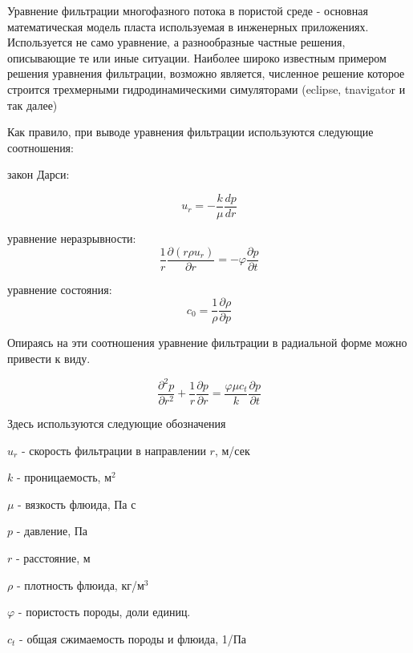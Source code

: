 Уравнение фильтрации многофазного потока в пористой среде - основная математическая модель пласта используемая в инженерных приложениях. Используется не само уравнение, а разнообразные частные решения, описывающие те или иные ситуации. Наиболее широко известным примером решения уравнения фильтрации, возможно является, численное решение которое строится трехмерными гидродинамическими симуляторами (eclipse, tnavigator и так далее)


Как правило, при выводе уравнения фильтрации используются следующие соотношения:

закон Дарси:  

\begin{equation} \label{eq:darcy_law_1}
 u_r=-\frac{k}{\mu}\frac{dp}{dr} 
\end{equation}

уравнение неразрывности: 
\begin{equation} \label{eq:mass_balance_1} 
\frac{1}{r}\frac{\partial\left(r\rho u_r\right)}{\partial r}=-\varphi\frac{\partial p}{\partial t} 
\end{equation}

уравнение состояния: 
\begin{equation} \label{eq:eos_1} 
c_0=\frac{1}{\rho}\frac{\partial\rho}{\partial p} 
\end{equation}

Опираясь на эти соотношения уравнение фильтрации в радиальной форме можно привести к виду.

\begin{equation} \label{eq:diff_eq_1} 
\frac{\partial ^2 p }{\partial r^2} + \frac{1}{r} \frac{\partial p}{\partial r} = \frac{\varphi \mu c_t}{k} \frac{\partial p}{\partial t} 
\end{equation}

Здесь используются следующие обозначения

$u_r$ - скорость фильтрации в направлении $r$, м/сек

$k$ - проницаемость, м$^2$

$\mu$ - вязкость флюида, Па с

$p$ - давление, Па 

$r$ - расстояние, м 

$\rho$ - плотность флюида, кг/м$^3$

$\varphi$ - пористость породы, доли единиц.

$c_t$ - общая сжимаемость породы и флюида, 1/Па

